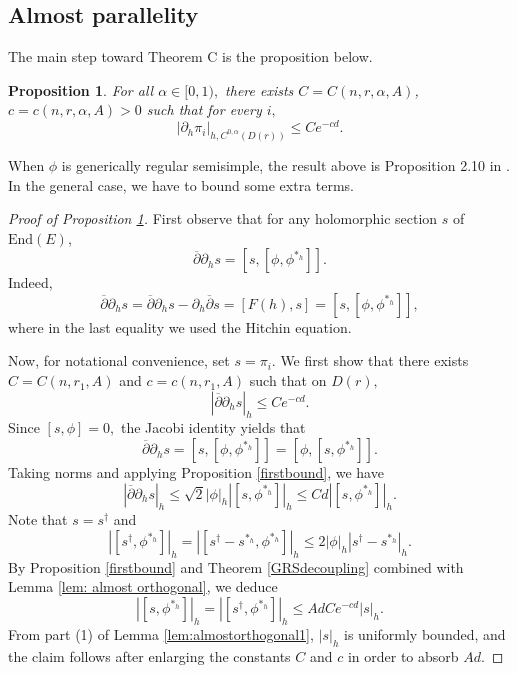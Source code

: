 \documentclass[10pt]{amsart}
\newtheorem{prop}[thm]{Proposition}
\theoremstyle{definition}
\begin{document}
\subsection{Almost parallelity}
The main step toward Theorem C is the proposition below.
\begin{prop}\label{dels}
    For all $\alpha\in [0,1),$ there exists $C=C(n,r,\alpha,A)$, $c=c(n,r,\alpha,A)>0$ such that for every $i,$
         $$|\partial_h \pi_i|_{h,C^{0,\alpha}(D(r))}\leq Ce^{-cd}.$$
\end{prop}
When $\phi$ is generically regular semisimple, the result above is Proposition 2.10 in \cite{Mo}. In the general case, we have to bound some extra terms.
\begin{proof}[Proof of Proposition \ref{dels}]
First observe that for any holomorphic section $s$ of $\textrm{End}(E)$, $$\overline{\partial}\partial_h s =[s,[\phi,\phi^{*_h}]].$$ Indeed, $$\overline{\partial}\partial_h s=\overline{\partial}\partial_hs - \partial_h\overline{\partial}s=[F(h),s]= [s,[\phi,\phi^{*_h}]],$$ where in the last equality we used the Hitchin equation.

    Now, for notational convenience, set $s=\pi_i$. We first show that there exists $C=C(n,r_1,A)$ and $c=c(n,r_1,A)$ such that on $D(r),$ 
    \begin{equation}\label{eq: deldelbars}
        |\overline{\partial}\partial_h s|_h\leq Ce^{-cd}.
    \end{equation}
 Since $[s,\phi]=0,$ the Jacobi identity yields that $$\overline{\partial}\partial_h s= [s,[\phi,\phi^{*_h}]]=[\phi,[s,\phi^{*_h}]].$$ Taking norms and applying Proposition \ref{firstbound}, we have $$|\overline{\partial}\partial_h s|_{h}\leq \sqrt{2}|\phi|_{h}|[s,\phi^{*_h}]|_{h}\leq Cd|[s,\phi^{*_h}]|_h.$$
     Note that $s=s^\dagger$ and $$|[s^\dagger,\phi^{*_h}]|_h= |[s^\dagger-s^{*_h},\phi^{*_h}]|_h\leq 2|\phi|_h|s^\dagger-s^{*_h}|_h.$$ By Proposition \ref{firstbound} and Theorem \ref{GRSdecoupling} combined with Lemma \ref{lem: almost orthogonal}, we deduce $$|[s,\phi^{*_h}]|_h=|[s^\dagger,\phi^{*_h}]|_h\leq AdCe^{-cd}|s|_h.$$ 
From part (1) of Lemma \ref{lem:almostorthogonal1}, $|s|_h$ is uniformly bounded, and the claim follows after enlarging the constants $C$ and $c$ in order to absorb $Ad$.


\end{proof}
\end{document}
